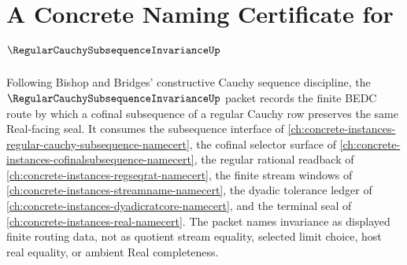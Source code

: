 \chapter{A Concrete Naming Certificate for $\RegularCauchySubsequenceInvarianceUp$}
\label{ch:concrete-instances-regular-cauchy-subsequence-invariance-namecert}

Following Bishop and Bridges' constructive Cauchy sequence discipline, the $\RegularCauchySubsequenceInvarianceUp$ packet records the finite BEDC route by which a cofinal subsequence of a regular Cauchy row preserves the same Real-facing seal. It consumes the subsequence interface of \autoref{ch:concrete-instances-regular-cauchy-subsequence-namecert}, the cofinal selector surface of \autoref{ch:concrete-instances-cofinalsubsequence-namecert}, the regular rational readback of \autoref{ch:concrete-instances-regseqrat-namecert}, the finite stream windows of \autoref{ch:concrete-instances-streamname-namecert}, the dyadic tolerance ledger of \autoref{ch:concrete-instances-dyadicratcore-namecert}, and the terminal seal of \autoref{ch:concrete-instances-real-namecert}. The packet names invariance as displayed finite routing data, not as quotient stream equality, selected limit choice, host real equality, or ambient Real completeness.

